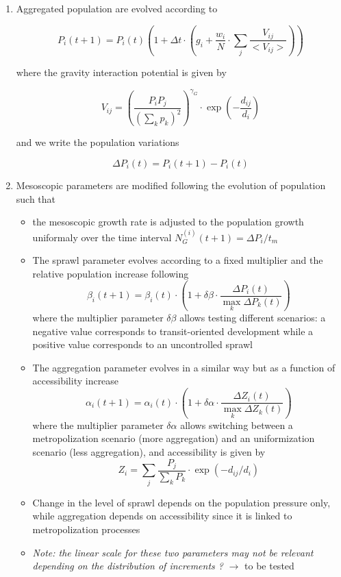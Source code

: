 \documentclass[11pt]{article}
\begin{document}
\begin{enumerate}
	\item Aggregated population are evolved according to
	
	\begin{equation}
		P_i(t+1) = P_i(t) \left(1 + \Delta t \cdot \left(g_i + \frac{w_i}{N} \cdot \sum_j \frac{V_{ij}}{<V_{ij}>} \right) \right)
	\end{equation}
	
	where the gravity interaction potential is given by 
	
	\begin{equation}
		V_{ij} = \left(\frac{P_i P_j}{(\sum_k p_k)^2}\right)^{\gamma_G} \cdot \exp \left(- \frac{d_{ij}}{d_i} \right)
	\end{equation}

	and we write the population variations
	
	\begin{equation}
		\Delta P_i (t) = P_i (t + 1) - P_i (t)
	\end{equation}

	
	\item Mesoscopic parameters are modified following the evolution of population such that 
		\begin{itemize}
			\item the mesoscopic growth rate is adjusted to the population growth uniformaly over the time interval	
			    $N_G^{(i)} (t + 1) = \Delta P_i / t_m$
			\item The sprawl parameter evolves according to a fixed multiplier and the relative population increase following 
			\begin{equation}
				\beta_i (t+1) = \beta_i (t) \cdot \left(1 + \delta\beta \cdot \frac{\Delta P_i (t)}{\max_k  \Delta P_k (t)}\right)
			\end{equation}
			where the multiplier parameter $\delta\beta$ allows testing different scenarios: a negative value corresponds to transit-oriented development while a positive value corresponds to an uncontrolled sprawl
			\item The aggregation parameter evolves in a similar way but as a function of accessibility increase
			\begin{equation}
				\alpha_i (t+1) = \alpha_i (t) \cdot \left(1 + \delta\alpha \cdot \frac{\Delta Z_i (t)}{\max_k  \Delta Z_k (t)}\right)
			\end{equation}
			where the multiplier parameter $\delta\alpha$ allows switching between a metropolization scenario (more aggregation) and an uniformization scenario (less aggregation), and accessibility is given by
			\begin{equation}
				Z_i = \sum_j \frac{P_j}{\sum_k P_k} \cdot \exp( - d_{ij} / d_i)
			\end{equation}
			\item Change in the level of sprawl depends on the population pressure only, while aggregation depends on accessibility since it is linked to metropolization processes
			\item \textit{Note: the linear scale for these two parameters may not be relevant depending on the distribution of increments ?} $\rightarrow$ to be tested
		\end{itemize}
	

\end{enumerate}
\end{document}
